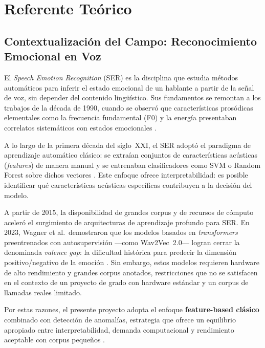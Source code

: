 \section{Referente Teórico}
\label{sec:referente_teorico}

\subsection{Contextualización del Campo: Reconocimiento Emocional en Voz}
\label{sec:rt_contexto}

El \textit{Speech Emotion Recognition} (SER) es la disciplina que estudia métodos
automáticos para inferir el estado emocional de un hablante a partir de la señal de
voz, sin depender del contenido lingüístico. Sus fundamentos se remontan a los trabajos
de la década de 1990, cuando se observó que características prosódicas elementales
como la frecuencia fundamental (F0) y la energía presentaban correlatos sistemáticos
con estados emocionales \cite{jha2022}.

A lo largo de la primera década del siglo~XXI, el SER adoptó el paradigma de
aprendizaje automático clásico: se extraían conjuntos de características acústicas
(\textit{features}) de manera manual y se entrenaban clasificadores como SVM o Random
Forest sobre dichos vectores \cite{nath2024}. Este enfoque ofrece interpretabilidad:
es posible identificar qué características acústicas específicas contribuyen a la
decisión del modelo.

A partir de 2015, la disponibilidad de grandes corpus y de recursos de cómputo
aceleró el surgimiento de arquitecturas de aprendizaje profundo para SER. En 2023,
Wagner et al.\ demostraron que los modelos basados en \textit{transformers}
preentrenados con autosupervisión ---como Wav2Vec~2.0--- logran cerrar la denominada
\textit{valence gap}: la dificultad histórica para predecir la dimensión positivo/negativo
de la emoción \cite{wagner2023}. Sin embargo, estos modelos requieren hardware de alto
rendimiento y grandes corpus anotados, restricciones que no se satisfacen en el contexto
de un proyecto de grado con hardware estándar y un corpus de llamadas reales limitado.

Por estas razones, el presente proyecto adopta el enfoque \textbf{feature-based
clásico} combinado con detección de anomalías, estrategia que ofrece un equilibrio
apropiado entre interpretabilidad, demanda computacional y rendimiento aceptable con
corpus pequeños \cite{khare2024}.

